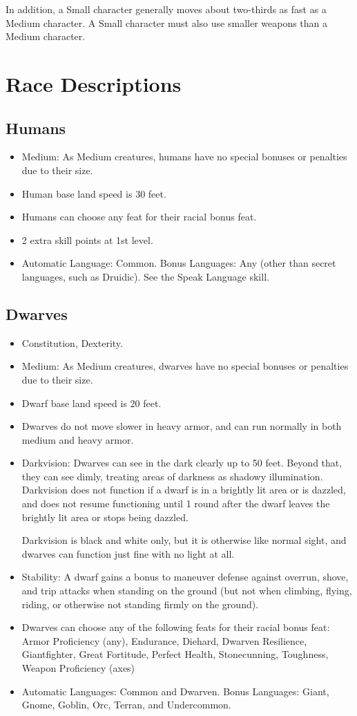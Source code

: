 In addition, a Small character generally moves about two-thirds as fast as a Medium character. A Small character must also use smaller weapons than a Medium character.

\section{Race Descriptions}

\subsection{Humans}
\begin{itemize}
\item Medium: As Medium creatures, humans have no special bonuses or penalties due to their size.
\item Human base land speed is 30 feet.
\item Humans can choose any feat for their racial bonus feat.
\item 2 extra skill points at 1st level.
\item Automatic Language: Common. Bonus Languages: Any (other than secret languages, such as Druidic). See the Speak Language skill.
\end{itemize}

\subsection{Dwarves}
\begin{itemize}
\item {} Constitution,  Dexterity.
\item Medium: As Medium creatures, dwarves have no special bonuses or penalties due to their size.
\item Dwarf base land speed is 20 feet.
\item Dwarves do not move slower in heavy armor, and can run normally in both medium and heavy armor.
\item Darkvision: Dwarves can see in the dark clearly up to 50 feet.   Beyond that, they can see dimly, treating areas of darkness as shadowy illumination. Darkvision does not function if a dwarf is in a brightly lit area or is dazzled, and does not resume functioning until 1 round after the dwarf leaves the brightly lit area or stops being dazzled.
\par Darkvision is black and white only, but it is otherwise like normal sight, and dwarves can function just fine with no light at all.
\item Stability: A dwarf gains a  bonus to maneuver defense against overrun, shove, and trip attacks when standing on the ground (but not when climbing, flying, riding, or otherwise not standing firmly on the ground).
\item Dwarves can choose any of the following feats for their racial bonus feat: Armor Proficiency (any), Endurance, Diehard, Dwarven Resilience, Giantfighter, Great Fortitude, Perfect Health, Stonecunning, Toughness, Weapon Proficiency (axes)
\item Automatic Languages: Common and Dwarven. Bonus Languages: Giant, Gnome, Goblin, Orc, Terran, and Undercommon.
\end{itemize}


